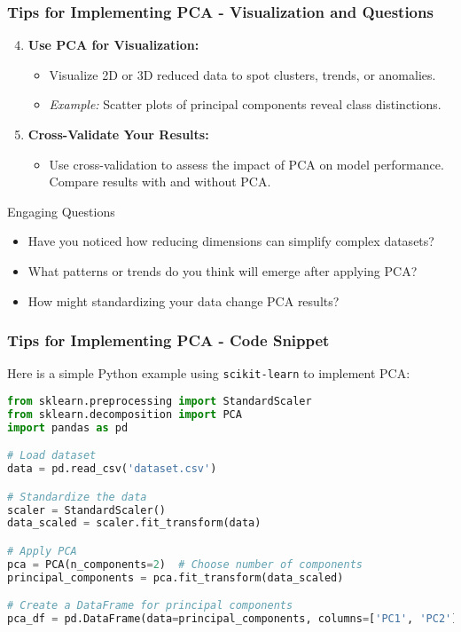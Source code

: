 \documentclass[aspectratio=169]{beamer}
\begin{document}
\begin{frame}[fragile]
    \frametitle{Tips for Implementing PCA - Visualization and Questions}
    \begin{enumerate}
        \setcounter{enumi}{3}
        \item \textbf{Use PCA for Visualization:}
        \begin{itemize}
            \item Visualize 2D or 3D reduced data to spot clusters, trends, or anomalies.
            \item \textit{Example:} Scatter plots of principal components reveal class distinctions.
        \end{itemize}

        \item \textbf{Cross-Validate Your Results:}
        \begin{itemize}
            \item Use cross-validation to assess the impact of PCA on model performance. Compare results with and without PCA.
        \end{itemize}

    \end{enumerate}
    
    \begin{block}{Engaging Questions}
        \begin{itemize}
            \item Have you noticed how reducing dimensions can simplify complex datasets?
            \item What patterns or trends do you think will emerge after applying PCA?
            \item How might standardizing your data change PCA results?
        \end{itemize}
    \end{block}
\end{frame}

\begin{frame}[fragile]
    \frametitle{Tips for Implementing PCA - Code Snippet}
    Here is a simple Python example using \texttt{scikit-learn} to implement PCA:

    \begin{lstlisting}[language=Python]
from sklearn.preprocessing import StandardScaler
from sklearn.decomposition import PCA
import pandas as pd

# Load dataset
data = pd.read_csv('dataset.csv')

# Standardize the data
scaler = StandardScaler()
data_scaled = scaler.fit_transform(data)

# Apply PCA
pca = PCA(n_components=2)  # Choose number of components
principal_components = pca.fit_transform(data_scaled)

# Create a DataFrame for principal components
pca_df = pd.DataFrame(data=principal_components, columns=['PC1', 'PC2'])
    \end{lstlisting}
\end{frame}
\end{document}
